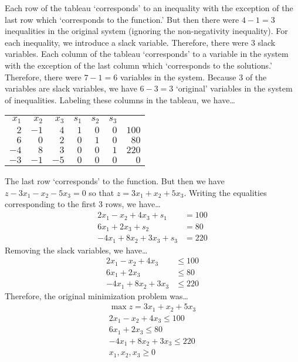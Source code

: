 \documentclass[11pt,letterpaper]{article}
\begin{document}
\sol Each row of the tableau `corresponds' to an inequality with the exception of the last row which `corresponds to the function.' But then there were $4 - 1= 3$ inequalities in the original system (ignoring the non-negativity inequality). For each inequality, we introduce a slack variable. Therefore, there were 3 slack variables. Each column of the tableau `corresponds' to a variable in the system with the exception of the last column which `corresponds to the solutions.' Therefore, there were $7 - 1= 6$ variables in the system. Because 3 of the variables are slack variables, we have $6 - 3= 3$ `original' variables in the system of inequalities. Labeling these columns in the tableau, we have\dots \par
	\begin{table}[!ht]
	\centering
	\begin{tabular}{rrrrrr|r}
	{\small $x_1$} & {\small $x_2$} & {\small $x_3$} & {\small $s_1$} & {\small $s_2$} & {\small $s_3$} & \\
	$2$ & $-1$ & $4$ & $1$ & $0$ & $0$ & $100$ \\
	$6$ & $0$ & $2$ & $0$ & $1$ & $0$ & $80$ \\
	$-4$ & $8$ & $3$ & $0$ & $0$ & $1$ & $220$ \\ \hline
	$-3$ & $-1$ & $-5$ & $0$ & $0$ & $0$ & $0$ \\
	\end{tabular}
	\end{table} \par
The last row `corresponds' to the function. But then we have $z - 3x_1 - x_2 - 5x_3= 0$ so that $z= 3x_1 + x_2 + 5x_3$. Writing the equalities corresponding to the first 3 rows, we have\dots
	\[
	\begin{aligned}
	2x_1 - x_2 + 4x_3 + s_1&= 100 \\
	6x_1 + 2x_3 + s_2&= 80 \\
	-4x_1 + 8x_2 + 3x_3 + s_3&= 220 
	\end{aligned}
	\]
Removing the slack variables, we have\dots
	\[
	\begin{aligned}
	2x_1 - x_2 + 4x_3&\leq 100 \\
	6x_1 + 2x_3&\leq 80 \\
	-4x_1 + 8x_2 + 3x_3&\leq 220 
	\end{aligned}
	\]
Therefore, the original minimization problem was\dots
	\[
	\begin{aligned}
	\max z= 3x_1 + x_2 + 5x_3 \\
	2x_1 - x_2 + 4x_3 \leq 100 \\
	6x_1 + 2x_3 \leq 80 \\
	-4x_1 + 8x_2 + 3x_3 \leq 220 \\
	x_1, x_2, x_3 \geq 0 
	\end{aligned}
	\] \pspace
\end{document}
